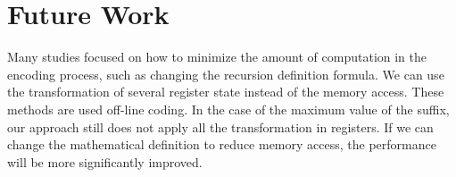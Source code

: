 \section{Future Work}
\label{sec:Future}

Many studies focused on how to minimize the amount of computation in the
encoding process, such as changing the recursion definition formula.  We
can use the transformation of several register state instead of the
memory access.  These methods are used off-line coding. In the case of
the maximum value of the suffix,  our approach still does not apply all
the transformation in registers.  If we can change the mathematical
definition to reduce memory access, the performance will be more
significantly improved.

